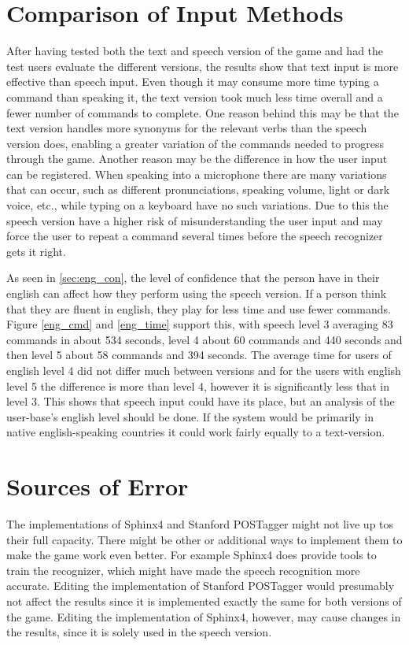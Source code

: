 \section{Comparison of Input Methods} %
After having tested both the text and speech version of the game and had the test users evaluate the different versions, the results show that text input is more effective than speech input. Even though it may consume more time typing a command than speaking it, the text version took much less time overall and a fewer number of commands to complete. One reason behind this may be that the text version handles more synonyms for the relevant verbs than the speech version does, enabling a greater variation of the commands needed to progress through the game. Another reason may be the difference in how the user input can be registered. When speaking into a microphone there are many variations that can occur, such as different pronunciations, speaking volume, light or dark voice, etc., while typing on a keyboard have no such variations. Due to this the speech version have a higher risk of misunderstanding the user input and may force the user to repeat a command several times before the speech recognizer gets it right. 

As seen in \ref{sec:eng_con}, the level of confidence that the person have in their english can affect how they perform using the speech version. If a person think that they are fluent in english, they play for less time and use fewer commands. Figure \ref{eng_cmd} and \ref{eng_time} support this, with speech level 3 averaging 83 commands in about 534 seconds, level 4 about 60 commands and 440 seconds and then level 5 about 58 commands and 394 seconds. The average time for users of english level 4 did not differ much between versions and for the users with english level 5 the difference is more than level 4, however it is significantly less that in level 3. This shows that speech input could have its place, but an analysis of the user-base's english level should be done. If the system would be primarily in native english-speaking countries it could work fairly equally to a text-version.

\section{Sources of Error} %
The implementations of Sphinx4 and Stanford POSTagger might not live up tos their full capacity. There might be other or additional ways to implement them to make the game work even better. For example Sphinx4 does provide tools to train the recognizer, which might have made the speech recognition more accurate. Editing the implementation of Stanford POSTagger would presumably not affect the results since it is implemented exactly the same for both versions of the game. Editing the implementation of Sphinx4, however, may cause changes in the results, since it is solely used in the speech version.


